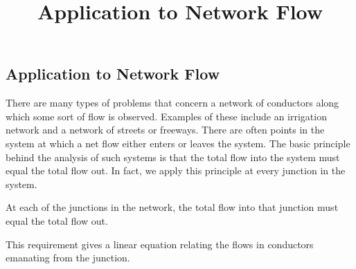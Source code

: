 \documentclass{ximera}
\title{Application to Network Flow} \license{CC BY-NC-SA 4.0}
\begin{document}
\begin{abstract}
\end{abstract}
\maketitle

\begin{onlineOnly}
\section*{Application to Network Flow}
\end{onlineOnly}

There are many types of problems that concern a network of conductors along which some sort of flow is observed. Examples of these include an irrigation network and a network of streets or freeways. There are often points in the system at which a net flow either enters or leaves the system. The basic principle behind the analysis of such systems is that the total flow into the system must equal the total flow out. In fact, we apply this principle at every junction in the system.

\begin{theorem}\label{001735}
At each of the junctions in the network, the total flow into that junction must equal the total flow out.
\end{theorem}

\noindent This requirement gives a linear equation relating the flows in conductors emanating from the junction.
\end{document}
